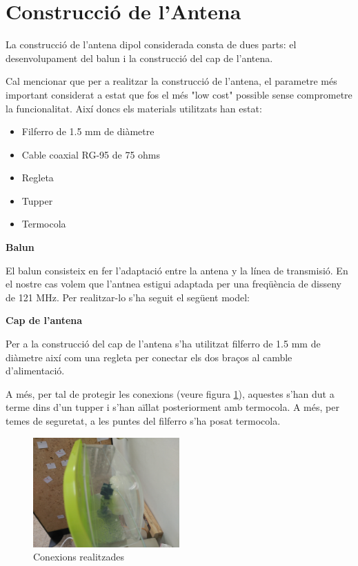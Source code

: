 \section{Construcció de l'Antena}

La construcció de l'antena dipol considerada consta de dues parts: el desenvolupament del balun i la construcció del cap de l'antena.

Cal mencionar que per a realitzar la construcció de l'antena, el parametre més important considerat a estat que fos el més "low cost" possible sense comprometre la funcionalitat. Així doncs els materials utilitzats han estat:

\begin{itemize}
\item Filferro de 1.5 mm de diàmetre
\item Cable coaxial RG-95 de 75 ohms 
\item Regleta 
\item Tupper
\item Termocola
\end{itemize}

\textbf{Balun}

El balun consisteix en fer l'adaptació entre la antena y la línea de transmisió. En el nostre cas volem que l'antnea estigui adaptada per una freqüència de disseny de 121 MHz. Per realitzar-lo s'ha seguit el següent model: %

\textbf{Cap de l'antena}

Per a la construcció del cap de l'antena s'ha utilitzat filferro de 1.5 mm de diàmetre així com una regleta per conectar els dos braços al camble d'alimentació.

A més, per tal de protegir les conexions (veure figura \ref{Conexions}), aquestes s'han dut a terme dins d'un tupper i s'han aïllat posteriorment amb termocola. A més, per temes de seguretat, a les puntes del filferro s'ha posat termocola. %

\begin{figure}[H]
\centering
\includegraphics[width=0.5\textwidth]{./images/Conexions}
\caption{Conexions realitzades}
\label{Conexions}
\end{figure}

